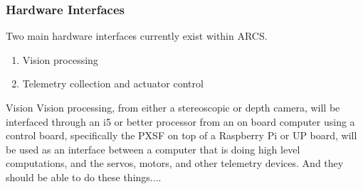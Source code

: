 \documentclass[compsoc,draftclsnofoot,onecolumn,10pt]{IEEEtran}
\begin{document}
\subsubsection{Hardware Interfaces} %
Two main hardware interfaces currently exist within ARCS. 
\begin{enumerate}
	\item Vision processing
	\item Telemetry collection and actuator control
\end{enumerate}

Vision 
Vision processing, from either a stereoscopic or depth camera, will be interfaced through 
an i5 or better processor from an on board computer using a control board, specifically 
the PXSF on top of a Raspberry Pi or UP board, will be used as an interface between a 
computer that is doing high level computations, and the servos, motors, and other telemetry 
devices. 
And they should be able to do these things....

\end{document}
